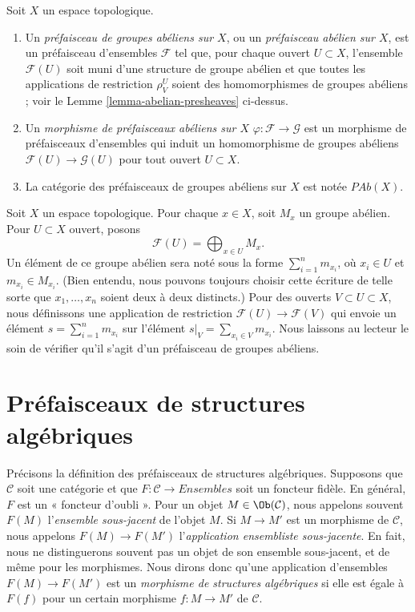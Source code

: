 \begin{definition}
\label{definition-abelian-presheaves}
Soit $X$ un espace topologique.
\begin{enumerate}
\item Un {\it préfaisceau de groupes abéliens sur $X$}, ou un
{\it préfaisceau abélien sur $X$},
est un préfaisceau d'ensembles $\mathcal{F}$ tel que, pour chaque ouvert
$U \subset X$, l'ensemble $\mathcal{F}(U)$ soit muni
d'une structure de groupe abélien et que toutes les applications de restriction
$\rho^U_V$ soient des homomorphismes de groupes abéliens ; voir le
Lemme \ref{lemma-abelian-presheaves} ci-dessus.
\item Un {\it morphisme de préfaisceaux abéliens sur $X$}
$\varphi : \mathcal{F} \to \mathcal{G}$ est un morphisme de préfaisceaux
d'ensembles qui induit
un homomorphisme de groupes abéliens $\mathcal{F}(U) \to \mathcal{G}(U)$
pour tout ouvert $U \subset X$.
\item La catégorie des préfaisceaux de groupes abéliens sur $X$ est notée
$\textit{PAb}(X)$.
\end{enumerate}
\end{definition}

\begin{example}
\label{example-direct-sum-points}
Soit $X$ un espace topologique. Pour chaque $x \in X$, soit
$M_x$ un groupe abélien. Pour $U \subset X$ ouvert,
posons
$$
\mathcal{F}(U) = \bigoplus\nolimits_{x \in U} M_x.
$$
Un élément de ce groupe abélien sera noté sous la forme
$\sum_{i = 1}^n m_{x_i}$, où $x_i \in U$ et $m_{x_i} \in M_{x_i}$.
(Bien entendu, nous pouvons toujours choisir cette écriture de telle sorte que
$x_1, \ldots, x_n$ soient deux à deux distincts.)
Pour des ouverts $V \subset U \subset X$, nous définissons une application de
restriction $\mathcal{F}(U) \to \mathcal{F}(V)$ qui
envoie un élément $s = \sum_{i = 1}^n m_{x_i}$
sur l'élément $s|_V = \sum_{x_i \in V} m_{x_i}$.
Nous laissons au lecteur le soin de vérifier qu'il s'agit d'un
préfaisceau de groupes abéliens.
\end{example}

\section{Préfaisceaux de structures algébriques}
\label{section-presheaves-structures}

\noindent
Précisons la définition
des préfaisceaux de structures algébriques.
Supposons que $\mathcal{C}$ soit une catégorie et
que $F : \mathcal{C} \to \textit{Ensembles}$ soit
un foncteur fidèle. En général, $F$ est un « foncteur
d'oubli ». Pour un objet $M \in \Ob(\mathcal{C})$,
nous appelons souvent $F(M)$ l'{\it ensemble sous-jacent} de
l'objet $M$. Si $M \to M'$ est un morphisme de $\mathcal{C}$,
nous appelons $F(M) \to F(M')$ l'{\it application ensembliste sous-jacente}.
En fait, nous ne distinguerons souvent pas un objet
de son ensemble sous-jacent, et de même pour les morphismes.
Nous dirons donc qu'une application d'ensembles $F(M) \to F(M')$
est un {\it morphisme de structures algébriques} si elle est
égale à $F(f)$ pour un certain morphisme $f : M \to M'$
de $\mathcal{C}$.

